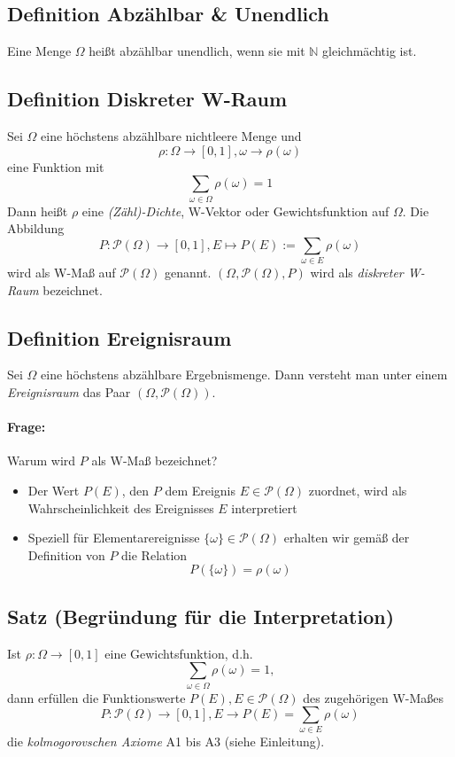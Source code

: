 \documentclass[12pt,a4paper]{article}
\begin{document}
	\subsection{Definition Abzählbar \& Unendlich}
	Eine Menge $\Omega$ heißt abzählbar unendlich, wenn sie mit $\mathbb{N}$ gleichmächtig ist.
	\subsection{Definition Diskreter W-Raum}
	Sei $\Omega$ eine höchstens abzählbare nichtleere Menge und
	$$\rho :\Omega\rightarrow[0,1],\omega\rightarrow\rho (\omega)$$
	eine Funktion mit
	$$\sum_{\omega\in\Omega}\rho (\omega)=1$$
	Dann heißt $\rho$ eine \textit{(Zähl)-Dichte}, W-Vektor oder Gewichtsfunktion auf $\Omega$.
	Die Abbildung
	$$P: \mathcal{P}(\Omega)\rightarrow[0,1], E\mapsto P(E):=\sum_{\omega\in E}\rho(\omega)$$
	wird als W-Maß auf $\mathcal{P}(\Omega)$ genannt. $(\Omega,\mathcal{P}(\Omega),P)$ wird als 
	\textit{diskreter W-Raum} bezeichnet.
	
	\subsection{Definition Ereignisraum}
	Sei $\Omega$ eine höchstens abzählbare Ergebnismenge. Dann versteht man unter einem \textit{Ereignisraum}
	das Paar $(\Omega,\mathcal{P}(\Omega))$.
	\paragraph{Frage: }
	Warum wird $P$ als W-Maß bezeichnet?
	\begin{itemize}
		\item Der Wert $P(E)$, den $P$ dem Ereignis $E\in\mathcal{P}(\Omega)$ zuordnet, wird als 							Wahrscheinlichkeit des Ereignisses $E$ interpretiert
		\item Speziell für Elementarereignisse $\{\omega\}\in\mathcal{P}(\Omega)$ erhalten wir gemäß der
		Definition von $P$ die Relation
		$$P(\{\omega\})=\rho(\omega)$$
	\end{itemize}
	\subsection{Satz (Begründung für die Interpretation)}
	\label{3dot4}
	Ist $\rho :\Omega\rightarrow[0,1]$ eine Gewichtsfunktion, d.h. $$\sum_{\omega\in\Omega}\rho(\omega)=1,$$
	dann erfüllen die Funktionswerte $P(E),E\in\mathcal{P}(\Omega)$ des zugehörigen W-Maßes 
	$$P:\mathcal{P}(\Omega)\rightarrow[0,1],E\rightarrow P(E)=\sum_{\omega\in E}\rho(\omega)$$
	die \textit{kolmogorovschen Axiome} A1 bis A3 (siehe Einleitung).
\end{document}
